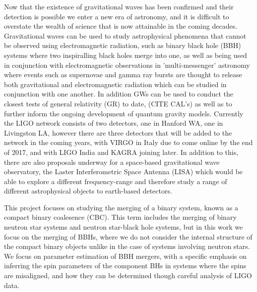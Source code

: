\documentclass[]{article}
\begin{document}
Now that the existence of gravitational waves has been confirmed and their detection is possible we enter a new era of astronomy, and it is difficult to overstate the wealth of science that is now attainable in the coming decades. Gravitational waves can be used to study astrophysical phenomena that cannot be observed using electromagnetic radiation, such as binary black hole (BBH) systems where two inspiralling black holes merge into one, as well as being used in conjunction with electromagnetic observations in 'multi-messenger' astronomy where events such as supernovae and gamma ray bursts are thought to release both gravitational and electromagnetic radiation which can be studied in conjunction with one another\cite{mm}\cite{mm2}. In addition GWs can be used to conduct the closest tests of general relativity (GR) to date, (CITE CAL's) as well as to further inform the ongoing development of quantum gravity models\cite{qgrav}. Currently the LIGO network consists of two detectors, one in Hanford WA, one in Livingston LA, however there are three detectors that will be added to the network in the coming years, with VIRGO in Italy due to come online by the end of 2017, and with LIGO India and KAGRA joining later. In addition to this, there are also proposals underway for a space-based gravitational wave observatory, the Laster Interferometric Space Antenna (LISA)\cite{lisa} which would be able to explore a different frequency-range and therefore study a range of different astrophysical objects to earth-based detectors.

This project focuses on studying the merging of a binary system, known as a compact binary coalesence (CBC). This term includes the merging of binary neutron star systems and neutron star-black hole systems, but in this work we focus on the merging of BBHs, where we do not consider the internal structure of the compact binary objects unlike in the case of systems involving neutron stars. We focus on parameter estimation of BBH mergers, with a specific emphasis on inferring the spin parameters of the component BHs in systems where the spins are misaligned, and how they can be determined though careful analysis of LIGO data.
\end{document}
